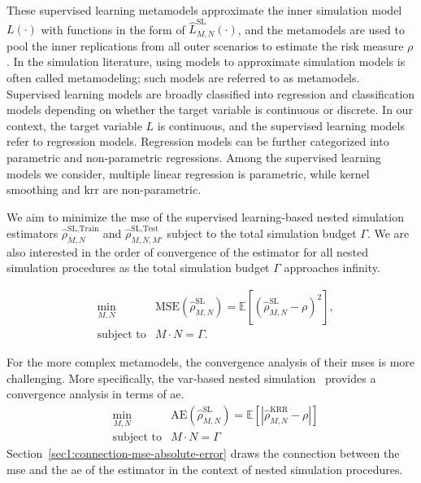 These supervised learning metamodels approximate the inner simulation model $L(\cdot)$ with functions in the form of $\hat{L}^{\text{SL}}_{M, N}(\cdot)$, and the metamodels are used to pool the inner replications from all outer scenarios to estimate the risk measure $\rho$.
In the simulation literature, using models to approximate simulation models is often called metamodeling; such models are referred to as metamodels.
Supervised learning models are broadly classified into regression and classification models depending on whether the target variable is continuous or discrete.
In our context, the target variable $L$ is continuous, and the supervised learning models refer to regression models.
Regression models can be further categorized into parametric and non-parametric regressions.
Among the supervised learning models we consider, multiple linear regression is parametric, while kernel smoothing and \gls{krr} are non-parametric.

We aim to minimize the \gls{mse} of the supervised learning-based nested simulation estimators $\hat{\rho}^{\text{SL}, \text{Train}}_{M, N}$ and $\hat{\rho}^{\text{SL}, \text{Test}}_{M, N, M'}$ subject to the total simulation budget $\Gamma$.
We are also interested in the order of convergence of the estimator for all nested simulation procedures as the total simulation budget $\Gamma$ approaches infinity.

\begin{align}
    & \min_{M, N}  & \text{MSE}(\hat{\rho}^{\text{SL}}_{M, N}) = \mathbb{E} \left[ \left( \hat{\rho}^{\text{SL}}_{M, N} - \rho \right)^2 \right], \nonumber \\
    & \text{subject to} & M \cdot N = \Gamma.
\end{align}

For the more complex metamodels, the convergence analysis of their \gls{mse}s is more challenging.
More specifically, the \gls{var}-based nested simulation~\citep{wang2022smooth} provides a convergence analysis in terms of \gls{ae}.
\begin{align}\label{eq1:ae}
    & \min_{M, N}  & \text{AE}(\hat{\rho}^{\text{SL}}_{M, N}) = \mathbb{E} \left[ \left| \hat{\rho}^{\text{KRR}}_{M, N} - \rho \right| \right] \nonumber \\
    & \text{subject to} & M \cdot N = \Gamma
\end{align}
Section~\ref{sec1:connection-mse-absolute-error} draws the connection between the \gls{mse} and the \gls{ae} of the estimator in the context of nested simulation procedures.

